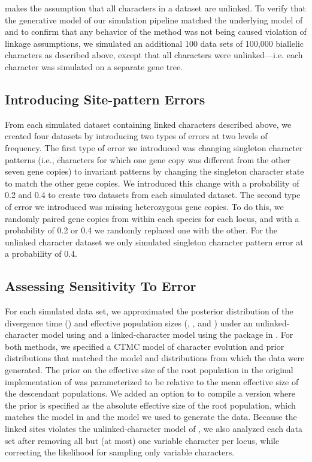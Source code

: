 \ecoevolity makes the assumption that all characters in a dataset are unlinked. 
To verify that the generative model of our simulation pipeline matched the underlying
model of \ecoevolity and to confirm that any behavior of the method was not 
being caused violation of linkage assumptions, we simulated an additional 100 data sets of 
100,000 biallelic characters as described above, except that all characters 
were unlinked---i.e. each character was simulated on a separate gene tree. 

\subsection{Introducing Site-pattern Errors}
From each simulated dataset containing linked characters described above, we 
created four datasets by 
introducing two types of errors at two levels of frequency. The first type of 
error we introduced was changing singleton character patterns (i.e., characters 
for which one gene copy was different from the other seven gene copies) to invariant 
patterns by changing the singleton character state to match the other gene 
copies. We introduced this change with a probability of 0.2 and 0.4 to create 
two datasets from each simulated dataset. The second type of error we introduced 
was missing heterozygous gene copies. To do this, we randomly paired gene copies 
from within each species for each locus, and with a probability 
of 0.2 or 0.4 we randomly replaced one with the other. For the unlinked character 
dataset we only simulated singleton character pattern error at a probability of 0.4.

\subsection{Assessing Sensitivity To Error}
For each simulated data set,
we approximated the posterior distribution of the divergence time (\divtime)
and effective population sizes
(\rootpopsize, \tippopsize[1], and \tippopsize[2])
under an
unlinked-character model using
\ecoevolity
\citep[Version 0.3.2; dev branch commit a7e9bf2;][]{Oaks2018ecoevolity}
and a linked-character model using the
\beast
\citep[Version 0.15.1;][]{ogilvieStarBEAST2BringsFaster2017} 
package in
\beastcore
\citep[Version 2.5.2;][]{bouckaertBEASTSoftwarePlatform2014}.
For both methods, we specified a CTMC model of character evolution and prior
distributions that matched the model and distributions from which the data were
generated.
The prior on the effective size of the root population in the original
implementation of \ecoevolity was parameterized to be relative to the mean
effective size of the descendant populations.
We added an option to \ecoevolity to compile a version where the prior is
specified as the absolute effective size of the root population,
which matches the model in \beast and the model we used to generate the data.
Because the linked sites violates the unlinked-character model of
\ecoevolity \citep{bryantInferringSpeciesTrees2012,Oaks2018ecoevolity},
we also analyzed each data set after removing all but (at most)
one variable character per locus, while correcting the likelihood
for sampling only variable characters.


